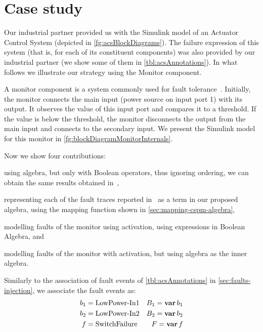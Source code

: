 \documentclass[12pt,openright,twoside,a4paper,oldfontcommands,english,brazil,final]{abntex2}
\theoremstyle{theo}
\def\Embraer{%
  Our industrial partner%
  \xspace%
}
\def\embraer{%
  our industrial partner%
  \xspace%
}
\newcommand{\simulink}{Simulink\xspace}
\def\varop{\ensuremath\operatorname{\mathbf{var}}}
\newcommand{\var}[1]{\ensuremath\varop #1}
\begin{document}
\chapter{Case study}
\label{chap:case-study}

\Embraer provided us with the \simulink model of an Actuator Control System (depicted in \cref{fg:acsBlockDiagrams}).
The failure expression of this system (that is, for each of its constituent components) was also provided by \embraer (we show some of them in \cref{tbl:acsAnnotations}).
In what follows we illustrate our strategy using the Monitor component.

A monitor component is a system commonly used for fault tolerance~\cite{ONB2002,KK2007}.
Initially, the monitor connects the main input (power source on input port 1) with its output.
It observes the value of this input port and compares it to a threshold.
If the value is below the threshold, the monitor disconnects the output from the main input and connects to the secondary input.
We present the \simulink model for this monitor in \cref{fg:blockDiagramMonitorInternals}.


Now we show four contributions:
\begin{alineasinline}
  \item using \ac{algebra}, but only with Boolean operators, thus ignoring ordering, we can obtain the same results obtained in~\cite{DM2012}, 
  \item representing each of the fault traces reported in~\cite{DM2012} as a term in our proposed \ac{algebra}, using the mapping function shown in \cref{sec:mapping-cspm-algebra},
  \item modelling faults of the monitor using \ac{activation}, using expressions in Boolean Algebra, and
  \item modelling faults of the monitor with \ac{activation}, but using \ac{algebra} as the inner algebra.
\end{alineasinline}
%
Similarly to the association of fault events of \cref{tbl:acsAnnotations} in \cref{sec:faults-injection}, we associate the fault events as:
%
\begin{align*}
b_1 &= \text{LowPower-In1}& B_1 = \var b_1\\
b_2 &= \text{LowPower-In2}& B_2 = \var b_2\\
f &= \text{SwitchFailure}& F = \var f
\end{align*}
\end{document}
